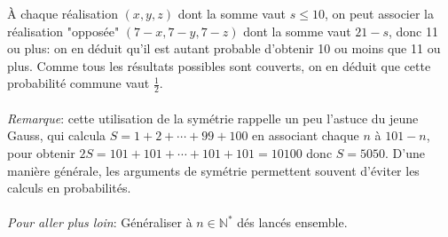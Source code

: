 \`A chaque réalisation $(x,y,z)$ dont la somme vaut $s\leq 10$, on peut associer la réalisation "opposée" $(7-x,7-y,7-z)$ dont la somme vaut $21-s$, donc 11 ou plus: on en déduit qu’il est autant probable d'obtenir 10 ou moins que 11 ou plus. Comme tous les résultats possibles sont couverts, on en déduit que cette probabilité commune vaut $\frac{1}{2}$.\\ \\
\textit{Remarque}: cette utilisation de la symétrie rappelle un peu l'astuce du jeune Gauss, qui calcula $S=1+2+\cdots+99+100$ en associant chaque $n$ \`a $101-n$, pour obtenir $2S=101+101+\cdots+101+101=10100$ donc $S=5050$. D'une manière générale, les arguments de symétrie permettent souvent d’éviter les calculs en probabilités.\\ \\
\textit{Pour aller plus loin}: Généraliser \`a $n\in\mathbb{N}^*$ dés lancés ensemble.

